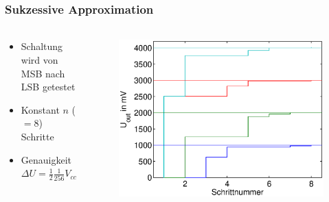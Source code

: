 \begin{frame}
    \frametitle{Sukzessive Approximation}
    \framesubtitle{}
    \begin{columns}[c]
            \begin{block}{}
                \begin{itemize}
                    \item Schaltung wird von MSB nach LSB getestet
                    \item Konstant $n$ ($=8$) Schritte
                    \item Genauigkeit $\Delta U = \frac{1}{2}\frac{1}{256} V_{cc}$
                \end{itemize}
            \end{block}
            \begin{figure}[H]
            \begin{center}
                    \includegraphics[scale=0.4]{./img/graph/Aufgabe2a.eps}
            \end{center}
            \end{figure}
    \end{columns}
\end{frame}

